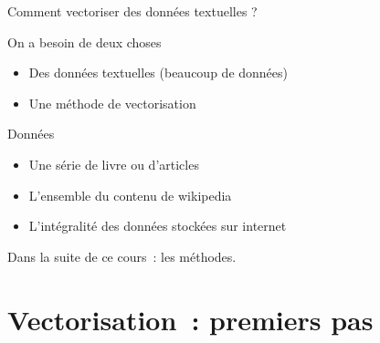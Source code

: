 \documentclass[serif, aspectratio=169]{beamer}
\begin{document}
\begin{frame}{Comment vectoriser des données textuelles ?}
    \begin{block}{On a besoin de deux choses}
        \begin{itemize}
            \item Des données textuelles (beaucoup de données)
            \item Une méthode de vectorisation
        \end{itemize}
    \end{block}
    \vfill
    \begin{block}{Données}
        \begin{itemize}
            \item Une série de livre ou d'articles
            \item L'ensemble du contenu de wikipedia
            \item L'intégralité des données stockées sur internet
        \end{itemize}
    \end{block}
    \vfill
    \begin{center}
        \Large
        Dans la suite de ce cours~: les méthodes.
    \end{center}
\end{frame}

\section{Vectorisation~: premiers pas}
\end{document}
